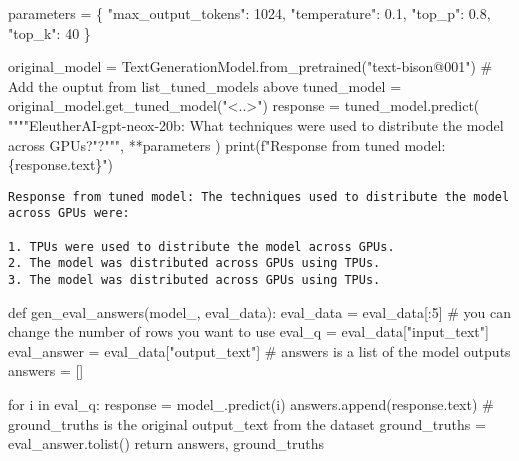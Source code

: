 \documentclass[
  letterpaper,
  DIV=11,
  numbers=noendperiod]{scrreprt}
\newenvironment{Shaded}{\begin{snugshade}}{\end{snugshade}}
\newcommand{\BuiltInTok}[1]{\textcolor[rgb]{0.00,0.23,0.31}{#1}}
\newcommand{\CommentTok}[1]{\textcolor[rgb]{0.37,0.37,0.37}{#1}}
\newcommand{\ControlFlowTok}[1]{\textcolor[rgb]{0.00,0.23,0.31}{#1}}
\newcommand{\DecValTok}[1]{\textcolor[rgb]{0.68,0.00,0.00}{#1}}
\newcommand{\FloatTok}[1]{\textcolor[rgb]{0.68,0.00,0.00}{#1}}
\newcommand{\KeywordTok}[1]{\textcolor[rgb]{0.00,0.23,0.31}{#1}}
\newcommand{\NormalTok}[1]{\textcolor[rgb]{0.00,0.23,0.31}{#1}}
\newcommand{\OperatorTok}[1]{\textcolor[rgb]{0.37,0.37,0.37}{#1}}
\newcommand{\SpecialCharTok}[1]{\textcolor[rgb]{0.37,0.37,0.37}{#1}}
\newcommand{\SpecialStringTok}[1]{\textcolor[rgb]{0.13,0.47,0.30}{#1}}
\newcommand{\StringTok}[1]{\textcolor[rgb]{0.13,0.47,0.30}{#1}}
\begin{document}
\begin{Shaded}
\begin{Highlighting}[]
\NormalTok{parameters }\OperatorTok{=}\NormalTok{ \{}
    \StringTok{"max\_output\_tokens"}\NormalTok{: }\DecValTok{1024}\NormalTok{,}
    \StringTok{"temperature"}\NormalTok{: }\FloatTok{0.1}\NormalTok{,}
    \StringTok{"top\_p"}\NormalTok{: }\FloatTok{0.8}\NormalTok{,}
    \StringTok{"top\_k"}\NormalTok{: }\DecValTok{40}
\NormalTok{\}}

\NormalTok{original\_model }\OperatorTok{=}\NormalTok{ TextGenerationModel.from\_pretrained(}\StringTok{"text{-}bison@001"}\NormalTok{)}
\CommentTok{\# Add the ouptut from list\_tuned\_models above}
\NormalTok{tuned\_model }\OperatorTok{=}\NormalTok{ original\_model.get\_tuned\_model(}\StringTok{"\textless{}..\textgreater{}"}\NormalTok{)}
\NormalTok{response }\OperatorTok{=}\NormalTok{ tuned\_model.predict(}
    \StringTok{""""EleutherAI{-}gpt{-}neox{-}20b: What techniques were used to distribute the model across GPUs?"?"""}\NormalTok{,}
    \OperatorTok{**}\NormalTok{parameters}
\NormalTok{    )}
\BuiltInTok{print}\NormalTok{(}\SpecialStringTok{f"Response from tuned model: }\SpecialCharTok{\{}\NormalTok{response}\SpecialCharTok{.}\NormalTok{text}\SpecialCharTok{\}}\SpecialStringTok{"}\NormalTok{)}
\end{Highlighting}
\end{Shaded}

\begin{verbatim}
Response from tuned model: The techniques used to distribute the model across GPUs were:

1. TPUs were used to distribute the model across GPUs.
2. The model was distributed across GPUs using TPUs.
3. The model was distributed across GPUs using TPUs.
\end{verbatim}

\begin{Shaded}
\begin{Highlighting}[]
\KeywordTok{def}\NormalTok{ gen\_eval\_answers(model\_, eval\_data):}
\NormalTok{  eval\_data }\OperatorTok{=}\NormalTok{ eval\_data[:}\DecValTok{5}\NormalTok{]  }\CommentTok{\# you can change the number of rows you want to use}
\NormalTok{  eval\_q }\OperatorTok{=}\NormalTok{ eval\_data[}\StringTok{"input\_text"}\NormalTok{]}
\NormalTok{  eval\_answer }\OperatorTok{=}\NormalTok{ eval\_data[}\StringTok{"output\_text"}\NormalTok{]}
  \CommentTok{\# answers is a list of the model outputs}
\NormalTok{  answers }\OperatorTok{=}\NormalTok{ []}

  \ControlFlowTok{for}\NormalTok{ i }\KeywordTok{in}\NormalTok{ eval\_q:}
\NormalTok{      response }\OperatorTok{=}\NormalTok{ model\_.predict(i)}
\NormalTok{      answers.append(response.text)}
  \CommentTok{\# ground\_truths is the original output\_text from the dataset}
\NormalTok{  ground\_truths }\OperatorTok{=}\NormalTok{ eval\_answer.tolist()}
  \ControlFlowTok{return}\NormalTok{ answers, ground\_truths}
\end{Highlighting}
\end{Shaded}
\end{document}
